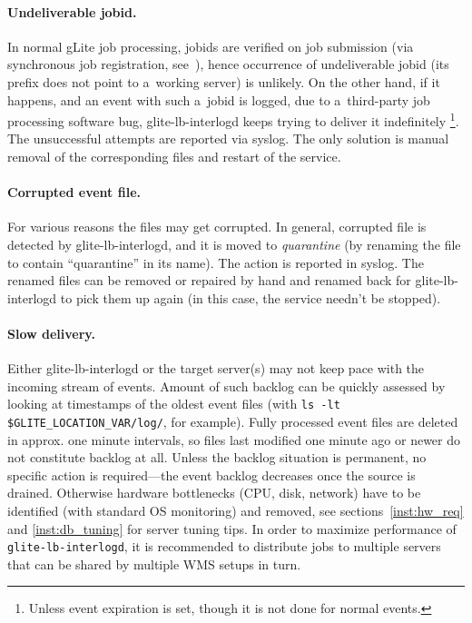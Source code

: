 \paragraph{Undeliverable jobid.}
In normal gLite job processing, jobids are verified on job submission
(via synchronous job registration, see~\cite{lbug}), hence occurrence of
undeliverable jobid (\ie its prefix does not point to
a~working \LB server) is unlikely.
On the other hand, if it happens,
and an event with such a~jobid is logged,
\eg due to a~third-party job processing software bug,
glite-lb-interlogd keeps trying to deliver it indefinitely%
\footnote{Unless event expiration is set, though it is not done for normal events.}.
The unsuccessful attempts are reported via syslog.
The only solution is manual
removal of the corresponding files
and restart of the service.

\paragraph{Corrupted event file.} 
For various reasons the files may get corrupted.
In general, corrupted file is detected by glite-lb-interlogd, and it is moved
to \emph{quarantine} (by renaming the file to contain ``quarantine'' in its name).
The action is reported in syslog.
The renamed files can be removed or repaired by hand and renamed back
for glite-lb-interlogd to pick them up again
(in this case, the service needn't be stopped).

\paragraph{Slow delivery.}
Either glite-lb-interlogd or the target \LB server(s) may not keep pace 
with the incoming stream of events. 
Amount of such backlog can be quickly assessed by looking at timestamps of the oldest
event files (with \verb'ls -lt $GLITE_LOCATION_VAR/log/', for example). 
Fully processed event files are deleted in approx. one minute intervals, 
so files last modified one minute ago or newer do not constitute backlog at all.
Unless the backlog situation is permanent, no specific action is required---the 
event backlog decreases once the source is drained.
Otherwise hardware bottlenecks (CPU, disk, network) have to be identified
(with standard OS monitoring) and removed, see sections~\ref{inst:hw_req} and
\ref{inst:db_tuning} for \LB server tuning tips. In order to maximize 
performance of \verb'glite-lb-interlogd', it is recommended to distribute
jobs to multiple \LB servers that can be shared by multiple WMS setups in turn.

